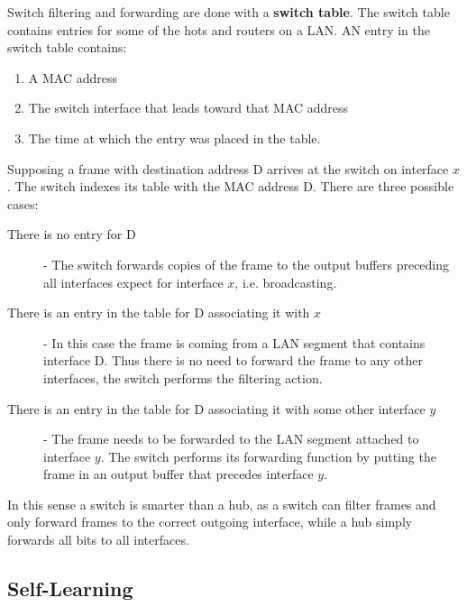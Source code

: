 \documentclass[12pt letter]{report}
\begin{document}


Switch filtering and forwarding are done with a \textbf{switch
table}. The switch table contains entries for some of the hots and
routers on a LAN. AN entry in the switch table contains:
\begin{enumerate}
  \item A MAC address
  \item The switch interface that leads toward that MAC address
  \item The time at which the entry was placed in the table.
\end{enumerate}

Supposing a frame with destination address D arrives at the switch on
interface $x$. The switch indexes its table with the MAC address D.
There are three possible cases:
\begin{description}
  \item[There is no entry for D] - The switch forwards copies of the
    frame to the output buffers preceding all interfaces expect for
    interface $x$, i.e. broadcasting.
  \item[There is an entry in the table for D associating it with $x$]
    - In this case the frame is coming from a LAN segment that
    contains interface D. Thus there is no need to forward the frame
    to any other interfaces, the switch performs the filtering action.
  \item[There is an entry in the table for D associating it with some
    other interface $y$] - The frame needs to be forwarded to the LAN
    segment attached to interface $y$. The switch performs its
    forwarding function by putting the frame in an output buffer that
    precedes interface $y$.
\end{description}

In this sense a switch is smarter than a hub, as a switch can filter
frames and only forward frames to the correct outgoing interface,
while a hub simply forwards all bits to all interfaces.

\subsection{Self-Learning}
\end{document}
